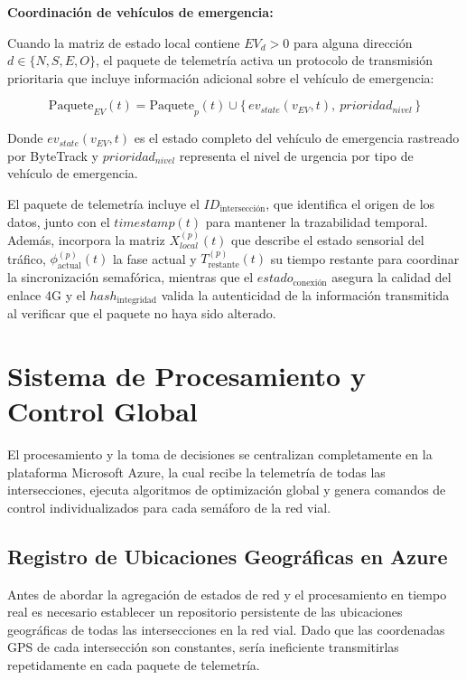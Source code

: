 \documentclass[12pt,a4paper,oneside]{report}
\begin{document}
\textbf{Coordinación de vehículos de emergencia:}

Cuando la matriz de estado local contiene \(EV_{d} > 0\) para alguna dirección \(d \in \{N, S, E, O\}\), el paquete de telemetría activa un protocolo de transmisión prioritaria que incluye información adicional sobre el vehículo de emergencia:

\begin{equation}
\text{Paquete}_{EV}(t) = \text{Paquete}_{p}(t) \cup \{\, ev_{state}(v_{EV},t),\ prioridad_{nivel} \,\}
\end{equation}

Donde \(ev_{state}(v_{EV},t)\) es el estado completo del vehículo de emergencia rastreado por ByteTrack y \(prioridad_{nivel}\) representa el nivel de urgencia por tipo de vehículo de emergencia.

El paquete de telemetría incluye el \(ID_{\text{intersección}}\), que identifica el origen de los datos, junto con el \(timestamp(t)\) para mantener la trazabilidad temporal. Además, incorpora la matriz \(X_{local}^{(p)}(t)\) que describe el estado sensorial del tráfico, \(\phi_{\text{actual}}^{(p)}(t)\) la fase actual y \(T_{\text{restante}}^{(p)}(t)\) su tiempo restante para coordinar la sincronización semafórica, mientras que el \(estado_{\text{conexión}}\) asegura la calidad del enlace 4G y el \(hash_{\text{integridad}}\) valida la autenticidad de la información transmitida al verificar que el paquete no haya sido alterado.

\section{Sistema de Procesamiento y Control Global}\label{sistema-de-procesamiento-y-control-global}

El procesamiento y la toma de decisiones se centralizan completamente en la plataforma Microsoft Azure, la cual recibe la telemetría de todas las intersecciones, ejecuta algoritmos de optimización global y genera comandos de control individualizados para cada semáforo de la red vial.

\subsection{Registro de Ubicaciones Geográficas en Azure}\label{registro-de-ubicaciones-geogruxe1ficas-en-azure}

Antes de abordar la agregación de estados de red y el procesamiento en tiempo real es necesario establecer un repositorio persistente de las ubicaciones geográficas de todas las intersecciones en la red vial. Dado que las coordenadas GPS de cada intersección son constantes, sería ineficiente transmitirlas repetidamente en cada paquete de telemetría.
\end{document}
